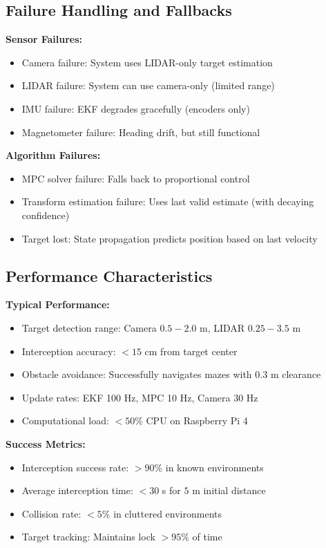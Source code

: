 \documentclass[11pt]{article}
\begin{document}
\subsection{Failure Handling and Fallbacks}

\textbf{Sensor Failures:}
\begin{itemize}
    \item Camera failure: System uses LIDAR-only target estimation
    \item LIDAR failure: System can use camera-only (limited range)
    \item IMU failure: EKF degrades gracefully (encoders only)
    \item Magnetometer failure: Heading drift, but still functional
\end{itemize}

\textbf{Algorithm Failures:}
\begin{itemize}
    \item MPC solver failure: Falls back to proportional control
    \item Transform estimation failure: Uses last valid estimate (with decaying confidence)
    \item Target lost: State propagation predicts position based on last velocity
\end{itemize}

\subsection{Performance Characteristics}

\textbf{Typical Performance:}
\begin{itemize}
    \item Target detection range: Camera $0.5-2.0$ m, LIDAR $0.25-3.5$ m
    \item Interception accuracy: $< 15$ cm from target center
    \item Obstacle avoidance: Successfully navigates mazes with $0.3$ m clearance
    \item Update rates: EKF 100 Hz, MPC 10 Hz, Camera 30 Hz
    \item Computational load: $< 50\%$ CPU on Raspberry Pi 4
\end{itemize}

\textbf{Success Metrics:}
\begin{itemize}
    \item Interception success rate: $> 90\%$ in known environments
    \item Average interception time: $< 30$ s for $5$ m initial distance
    \item Collision rate: $< 5\%$ in cluttered environments
    \item Target tracking: Maintains lock $> 95\%$ of time
\end{itemize}
\end{document}

